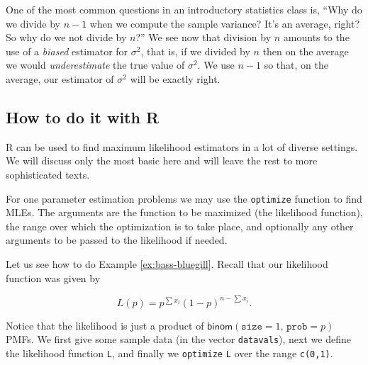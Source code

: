\documentclass[]{book}
\newenvironment{Shaded}{\begin{snugshade}}{\end{snugshade}}
\newcommand{\KeywordTok}[1]{\textcolor[rgb]{0.13,0.29,0.53}{\textbf{{#1}}}}
\newcommand{\DataTypeTok}[1]{\textcolor[rgb]{0.13,0.29,0.53}{{#1}}}
\newcommand{\DecValTok}[1]{\textcolor[rgb]{0.00,0.00,0.81}{{#1}}}
\newcommand{\StringTok}[1]{\textcolor[rgb]{0.31,0.60,0.02}{{#1}}}
\newcommand{\OtherTok}[1]{\textcolor[rgb]{0.56,0.35,0.01}{{#1}}}
\newcommand{\NormalTok}[1]{{#1}}
\numberwithin{equation}{chapter}
\numberwithin{figure}{chapter}
\theoremstyle{plain}
\theoremstyle{definition}
\theoremstyle{remark}
\theoremstyle{definition}
\theoremstyle{definition}
\theoremstyle{remark}
\begin{document}
One of the most common questions in an introductory statistics class is,
``Why do we divide by \(n-1\) when we compute the sample variance? It's
an average, right? So why do we not divide by \(n\)?'' We see now that
division by \(n\) amounts to the use of a \emph{biased} estimator for
\(\sigma^{2}\), that is, if we divided by \(n\) then on the average we
would \emph{underestimate} the true value of \(\sigma^{2}\). We use
\(n-1\) so that, on the average, our estimator of \(\sigma^{2}\) will be
exactly right.

\subsection{How to do it with R}\label{how-to-do-it-with-r-32}

R can be used to find maximum likelihood estimators in a lot of diverse
settings. We will discuss only the most basic here and will leave the
rest to more sophisticated texts.

For one parameter estimation problems we may use the \texttt{optimize}
function to find MLEs. The arguments are the function to be maximized
(the likelihood function), the range over which the optimization is to
take place, and optionally any other arguments to be passed to the
likelihood if needed.

Let us see how to do Example \ref{ex:bass-bluegill}. Recall that our
likelihood function was given by

\begin{equation}
L(p)=p^{\sum x_{i}}(1-p)^{n-\sum x_{i}}.
\end{equation}

Notice that the likelihood is just a product of
\(\mathsf{binom}(\mathtt{size}=1,\,\mathtt{prob}=p)\) PMFs. We first
give some sample data (in the vector \texttt{datavals}), next we define
the likelihood function \texttt{L}, and finally we \texttt{optimize}
\texttt{L} over the range \texttt{c(0,1)}.

\begin{Shaded}
\end{Shaded}
\end{document}
